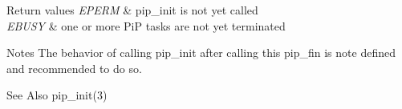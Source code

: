 \begin{DoxyRetVals}{Return values}
{\em E\-P\-E\-R\-M} & {\ttfamily pip\-\_\-init} is not yet called \\
\hline
{\em E\-B\-U\-S\-Y} & {\ttfamily one} or more Pi\-P tasks are not yet terminated\\
\hline
\end{DoxyRetVals}
\begin{DoxyParagraph}{Notes}
The behavior of calling {\ttfamily pip\-\_\-init} after calling this {\ttfamily pip\-\_\-fin} is note defined and recommended to do so.
\end{DoxyParagraph}
\par
\par
\begin{DoxySeeAlso}{See Also}
pip\-\_\-init(3) 
\end{DoxySeeAlso}
